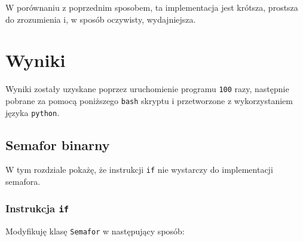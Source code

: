 \documentclass[11pt]{article}
\newenvironment{Shaded}{}{}
\newcommand{\KeywordTok}[1]{\textcolor[rgb]{0.00,0.44,0.13}{\textbf{{#1}}}}
\newcommand{\DataTypeTok}[1]{\textcolor[rgb]{0.56,0.13,0.00}{{#1}}}
\newcommand{\DecValTok}[1]{\textcolor[rgb]{0.25,0.63,0.44}{{#1}}}
\newcommand{\StringTok}[1]{\textcolor[rgb]{0.25,0.44,0.63}{{#1}}}
\newcommand{\FunctionTok}[1]{\textcolor[rgb]{0.02,0.16,0.49}{{#1}}}
\newcommand{\NormalTok}[1]{{#1}}
\newcommand{\ControlFlowTok}[1]{\textcolor[rgb]{0.00,0.44,0.13}{\textbf{{#1}}}}
\newcommand{\ExtensionTok}[1]{{#1}}
\newcommand{\AttributeTok}[1]{\textcolor[rgb]{0.49,0.56,0.16}{{#1}}}
\begin{document}
W porównaniu z poprzednim sposobem, ta implementacja jest krótsza,
prostsza do zrozumienia i, w sposób oczywisty, wydajniejsza.

    \hypertarget{wyniki}{%
\section{Wyniki}\label{wyniki}}

Wyniki zostały uzyskane poprzez uruchomienie programu \texttt{100} razy,
następnie pobrane za pomocą poniższego \texttt{bash} skryptu i
przetworzone z wykorzystaniem języka \texttt{python}.

\begin{Shaded}
\end{Shaded}

    \hypertarget{semafor-binarny}{%
\subsection{Semafor binarny}\label{semafor-binarny}}

W tym rozdziale pokażę, że instrukcji \texttt{if} nie wystarczy do
implementacji semafora.

    \hypertarget{instrukcja-if}{%
\subsubsection{\texorpdfstring{Instrukcja
\texttt{if}}{Instrukcja if}}\label{instrukcja-if}}

Modyfikuję klasę \texttt{Semafor} w następujący sposób:
\end{document}
